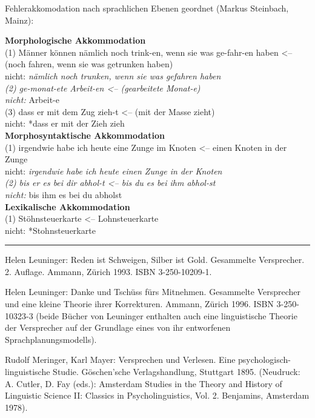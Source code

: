 \documentclass[
  letterpaper,
]{scrbook}
\begin{document}
Fehlerakkomodation nach sprachlichen Ebenen geordnet (Markus Steinbach,
Mainz):

\textbf{Morphologische Akkommodation}\\
(1) Männer können nämlich noch trink-en, wenn sie was ge-fahr-en haben
\textless-- (noch fahren, wenn sie was getrunken haben)\\
nicht: \emph{nämlich noch trunken, wenn sie was gefahren haben\\
(2) ge-monat-ete Arbeit-en \textless-- (gearbeitete Monat-e)\\
nicht: }Arbeit-e\\
(3) dass er mit dem Zug zieh-t \textless-- (mit der Masse zieht)\\
nicht: *dass er mit der Zieh zieh\\

\textbf{Morphosyntaktische Akkommodation}\\
(1) irgendwie habe ich heute eine Zunge im Knoten \textless-- einen
Knoten in der Zunge\\
nicht: \emph{irgendwie habe ich heute einen Zunge in der Knoten\\
(2) bis er es bei dir abhol-t \textless-- bis du es bei ihm abhol-st\\
nicht: }bis ihm es bei du abholst\\

\textbf{Lexikalische Akkommodation}\\
(1) Stöhnsteuerkarte \textless-- Lohnsteuerkarte\\
nicht: *Stohnsteuerkarte\\

\begin{center}\rule{0.5\linewidth}{0.5pt}\end{center}

Helen Leuninger: Reden ist Schweigen, Silber ist Gold. Gesammelte
Versprecher. 2. Auflage. Ammann, Zürich 1993. ISBN 3-250-10209-1.

Helen Leuninger: Danke und Tschüss fürs Mitnehmen. Gesammelte
Versprecher und eine kleine Theorie ihrer Korrekturen. Ammann, Zürich
1996. ISBN 3-250-10323-3 (beide Bücher von Leuninger enthalten auch eine
linguistische Theorie der Versprecher auf der Grundlage eines von ihr
entworfenen Sprachplanungsmodells).

Rudolf Meringer, Karl Mayer: Versprechen und Verlesen. Eine
psychologisch-linguistische Studie. Göschen'sche Verlagshandlung,
Stuttgart 1895. (Neudruck: A. Cutler, D. Fay (eds.): Amsterdam Studies
in the Theory and History of Linguistic Science II: Classics in
Psycholinguistics, Vol. 2. Benjamins, Amsterdam 1978).
\end{document}
